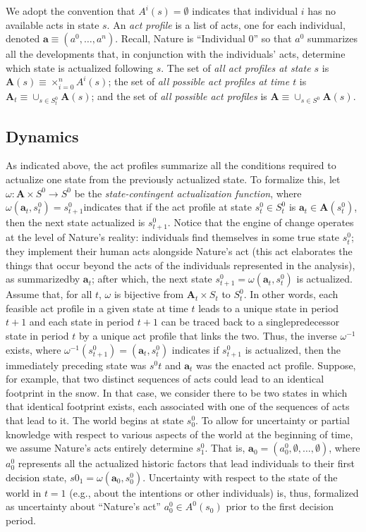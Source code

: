 \documentclass[
11pt,
titlepage,
reqno,
]{article}%
\theoremstyle{definition}
\begin{document}
We adopt the convention that $A^i(s)=\emptyset$ indicates that individual $i$ has no available acts in state $s$.
An \textit{act profile} is a list of acts, one for each individual, denoted  $\mathbf{a}\equiv(a^0,\ldots,a^n)$. 
Recall, Nature is ``Individual 0'' so that $a^0$ summarizes all the developments that, in conjunction with the individuals' acts, determine which state is actualized following $s$. 
The set of \textit{all act profiles at state $s$} is $\mathbf{A}(s)\equiv \times_{i=0}^n A^i(s)$; the set of \textit{all possible act profiles at time $t$} is  $\mathbf{A}_t\equiv \cup_{s\in S^0_t} \mathbf{A}(s)$; and the set of \textit{all possible act profiles} is $\mathbf{A}\equiv \cup_{s\in S^0} \mathbf{A}(s)$. 


\subsection{Dynamics  } 
  
As indicated above, the act profiles summarize all the conditions required to actualize one state from the previously actualized state. 
To formalize this, let $\omega:\mathbf{A}\times S^0\rightarrow S^0$ be the \textit{state-contingent actualization function}, where $\omega(\mathbf{a}_t,s^0_t)=s^0_{t+1}$indicates that if the act profile at state $s^0_t\in S^0_t$ is $\mathbf{a}_t\in \mathbf{A}(s^0_t)$, then the next state actualized is $s^0_{t+1}$.
Notice that the engine of change operates at the level of Nature's reality: individuals find themselves in some true state $s^0_t$; 
they implement their human acts alongside Nature's act (this act elaborates the things that occur beyond the acts of the individuals represented in the analysis), as summarizedby $\mathbf{a}_t$;
after which, the next state $s^0_{t+1}=\omega(\mathbf{a}_t,s^0_t)$ is actualized. 
Assume that, for all $t$, $\omega$ is bijective from $\mathbf{A}_t\times S_t$ to $S^0_t$.
In other words, each feasible  act profile in a given state at time $t$ leads to a unique state in period $t+1$ and each state in period $t+1$ can be traced back to a singlepredecessor state in period $t$ by a unique act profile that links the two.
Thus, the inverse $\omega^{-1}$ exists, where $\omega^{-1}(s^0_{t+1})=(\mathbf{a}_t,s^0_t)$ indicates if $s^0_{t+1}$ is actualized, then the immediately preceding state was $s^0t$ and $\mathbf{a}_t$ was the enacted act profile.
Suppose, for example, that two distinct sequences of acts could lead to an identical footprint in the snow.
In that case, we consider there to be two states in which that identical footprint exists, each associated with one of the sequences of acts that lead to it. 
The world begins at state $s_0^0$.
To allow for uncertainty or partial knowledge with respect to various aspects of the world at the beginning of time, we assume Nature's acts entirely determine $s^0_{1}$. 
That is, $\mathbf{a}_0=(a^0_0,\emptyset,\ldots,\emptyset)$, where $a^0_0$ represents all the actualized historic factors that lead individuals to their  first decision state, $s0_1=\omega(\mathbf{a}_0,s^0_0)$.
Uncertainty with respect to the state of the world in $t=1$ (e.g., about the intentions or other individuals) is, thus, formalized as uncertainty about ``Nature's act'' $a^0_0\in A^0(s_0)$ prior to the first decision period.
\end{document}
